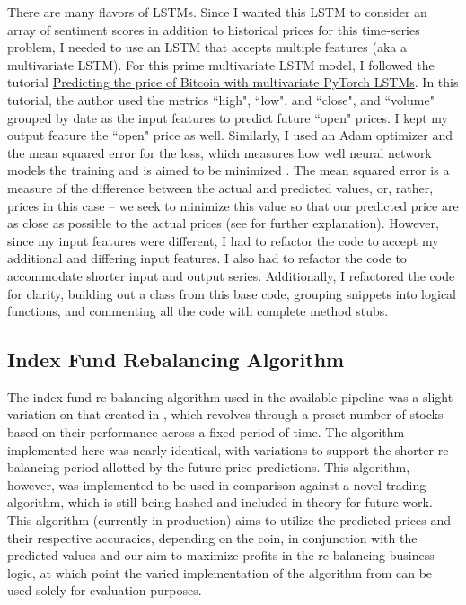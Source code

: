 \documentclass[10pt,twocolumn]{article}
\begin{document}
There are many flavors of LSTMs. Since I wanted this LSTM to consider an array of sentiment scores in addition to historical prices for this time-series problem, I needed to use an LSTM that accepts multiple features (aka a multivariate LSTM). For this prime multivariate LSTM model, I followed the tutorial \href{https://charlieoneill.medium.com/predicting-the-price-of-bitcoin-with-multivariate-pytorch-lstms-695bc294130}{Predicting the price of Bitcoin with multivariate PyTorch LSTMs}. In this tutorial, the author used the metrics ``high", ``low", and ``close", and ``volume" grouped by date as the input features to predict future ``open" prices. I kept my output feature the ``open" price as well. Similarly, I used an Adam optimizer and the mean squared error for the loss, which measures how well neural network models the training and is aimed to be minimized \cite{lossfunctions}. The mean squared error is a measure of the difference between the actual and predicted values, or, rather, prices in this case -- we seek to minimize this value so that our predicted price are as close as possible to the actual prices (see  for further explanation). However, since my input features were different, I had to refactor the code to accept my additional and differing input features. I also had to refactor the code to accommodate shorter input and output series. Additionally, I refactored the code for clarity, building out a class from this base code, grouping snippets into logical functions, and commenting all the code with complete method stubs.


\subsection{Index Fund Rebalancing Algorithm}

The index fund re-balancing algorithm used in the available pipeline was a slight variation on that created in \textcite{algorithmictrading}, which revolves through a preset number of stocks based on their performance across a fixed period of time. The algorithm implemented here was nearly identical, with variations to support the shorter re-balancing period allotted by the future price predictions. This algorithm, however, was implemented to be used in comparison against a novel trading algorithm, which is still being hashed and included in theory for future work. This algorithm (currently in production) aims to utilize the predicted prices and their respective accuracies, depending on the coin, in conjunction with the predicted values and our aim to maximize profits in the re-balancing business logic, at which point the varied implementation of the algorithm from \textcite{algorithmictrading} can be used solely for evaluation purposes.
\end{document}
